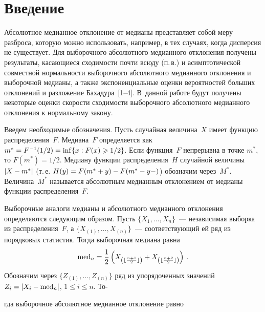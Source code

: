       \begin{multicols}{2}
      
            \label{st\stat}

\section{Введение}

Абсолютное медианное отклонение от медианы представляет собой меру разброса, 
которую можно использовать, например, в тех случаях, когда дисперсия не существует. 
Для выборочного абсолютного медианного отклонения получены результаты, касающиеся 
сходимости почти всюду (п.\,в.) и асимптотической совместной нормальности выборочного 
абсолютного медианного отклонения и выборочной медианы, а также экспоненциальные 
оценки вероятностей больших отклонений и разложение Бахадура~[1--4]. 
В~данной работе будут получены некоторые оценки скорости сходимости выборочного 
абсолютного медианного отклонения к нормальному закону.

Введем необходимые обозначения. Пусть случайная величина~$X$ имеет функцию распределения~$F$. 
Медиана~$F$ определяется как $m^*\hm=F^{-1}(1/2)\hm=\inf\{x:F(x)\hm\geqslant1/2\}$. 
Если функция~$F$ непрерывна в точке $m^*$, то $F(m^*)=1/2$. Медиану функции распределения~$H$ 
случайной величины $\left\vert X-m^*\right\vert$ (т.\,е. $H(y)\hm=F(m^*+y)\hm-F(m^*-y-)$) 
обозначим через~$M^*$. Величина~$M^*$ называется абсолютным медианным отклонением 
от медианы функции распределения~$F$.

Выборочные аналоги медианы и абсолютного медианного отклонения определяются следующим образом. 
Пусть $\{X_1,\ldots,X_n\}$~--- независимая выборка из распределения~$F$, 
а $\{X_{(1)},\ldots,X_{(n)}\}$~--- соответствующий ей ряд из порядковых статистик. 
Тогда выборочная медиана равна
$$
\mathrm{med}_n=\displaystyle\frac{\displaystyle 1\mathstrut}{\displaystyle 2\mathstrut}\left(X_{\left(\lfloor\frac{n+1}{2}\rfloor\right)}+
X_{\left(\lfloor\frac{n+2}{2}\rfloor\right)}\right)\,.
$$
Обозначим через $\{Z_{(1)},\ldots,Z_{(n)}\}$ ряд из упорядоченных значений 
$Z_i=\left\vert X_i-\mathrm{med}_n\right\vert$, $1\leqslant i\leqslant n$. То-\linebreak\vspace*{-12pt}
\columnbreak

\noindent
гда выборочное абсолютное 
медианное отклонение равно


\end{multicols}
